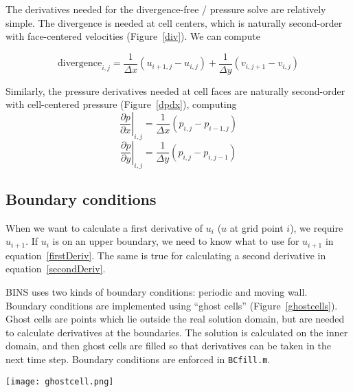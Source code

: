 \documentclass[12pt]{article}
\begin{document}
\FloatBarrier
The derivatives needed for the divergence-free / pressure solve are relatively simple.  The divergence is needed at cell centers, which is naturally second-order with face-centered velocities (Figure~\ref{div}). We can compute

\[ \text{divergence}_{i,j} = \frac{1}{\Delta x}\left( u_{i+1,j}-u_{i,j}\right) + \frac{1}{\Delta y}\left( v_{i,j+1}-v_{i,j}\right) \]

Similarly, the pressure derivatives needed at cell faces are naturally second-order with cell-centered pressure (Figure~\ref{dpdx}), computing
\[ \left.\frac{\partial p}{\partial x}\right|_{i,j} = \frac{1}{\Delta x}\left( p_{i,j} - p_{i-1,j}\right)\]
\[ \left.\frac{\partial p}{\partial y}\right|_{i,j} = \frac{1}{\Delta y}\left( p_{i,j} - p_{i,j-1}\right)\]

\FloatBarrier
\begin{center}
\begin{figure*}
\center
{}  
\caption{First derivatives for the divergence-free / pressure solve.}
\label{pressDeriv}
\end{figure*}
\end{center}



\FloatBarrier
\subsection{Boundary conditions}
\label{BCs}
When we want to calculate a first derivative of $u_i$ ($u$ at grid point $i$), we require $u_{i+1}$.  If $u_i$ is on an upper boundary, we need to know what to use for $u_{i+1}$ in equation~\ref{firstDeriv}.  The same is true for calculating a second derivative in equation~\ref{secondDeriv}.

BINS uses two kinds of boundary conditions: periodic and moving wall.  Boundary conditions are implemented using ``ghost cells'' (Figure~\ref{ghostcells}).  Ghost cells are points which lie outside the real solution domain, but are needed to calculate derivatives at the boundaries.  The solution is calculated on the inner domain, and then ghost cells are filled so that derivatives can be taken in the next time step.  Boundary conditions are enforced in \texttt{BCfill.m}.

\begin{center}
\begin{figure*}
\center
\texttt{[image: ghostcell.png]} 
\caption{Ghostcells outside the boundary of the domain.}
\label{ghostcells}
\end{figure*}
\end{center}
\end{document}
